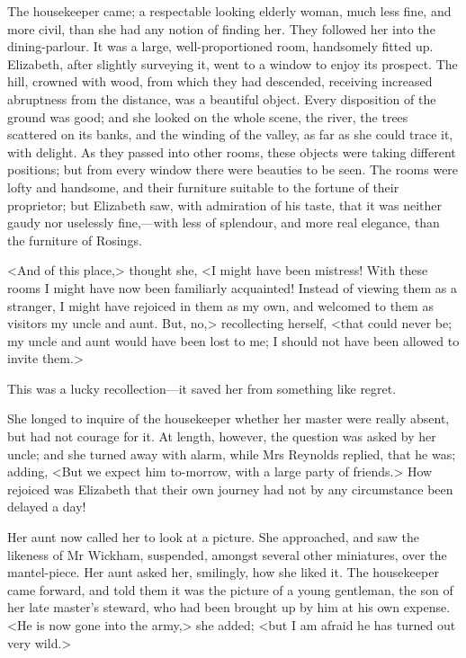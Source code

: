 The housekeeper came; a respectable looking elderly woman, much less fine, and more civil, than she had any notion of finding her. They followed her into the dining-parlour. It was a large, well-proportioned room, handsomely fitted up. Elizabeth, after slightly surveying it, went to a window to enjoy its prospect. The hill, crowned with wood, from which they had descended, receiving increased abruptness from the distance, was a beautiful object. Every disposition of the ground was good; and she looked on the whole scene, the river, the trees scattered on its banks, and the winding of the valley, as far as she could trace it, with delight. As they passed into other rooms, these objects were taking different positions; but from every window there were beauties to be seen. The rooms were lofty and handsome, and their furniture suitable to the fortune of their proprietor; but Elizabeth saw, with admiration of his taste, that it was neither gaudy nor uselessly fine,—with less of splendour, and more real elegance, than the furniture of Rosings.

<And of this place,> thought she, <I might have been mistress! With these rooms I might have now been familiarly acquainted! Instead of viewing them as a stranger, I might have rejoiced in them as my own, and welcomed to them as visitors my uncle and aunt. But, no,> recollecting herself, <that could never be; my uncle and aunt would have been lost to me; I should not have been allowed to invite them.>

This was a lucky recollection—it saved her from something like regret.

She longed to inquire of the housekeeper whether her master were really absent, but had not courage for it. At length, however, the question was asked by her uncle; and she turned away with alarm, while Mrs Reynolds replied, that he was; adding, <But we expect him to-morrow, with a large party of friends.> How rejoiced was Elizabeth that their own journey had not by any circumstance been delayed a day!

Her aunt now called her to look at a picture. She approached, and saw the likeness of Mr Wickham, suspended, amongst several other miniatures, over the mantel-piece. Her aunt asked her, smilingly, how she liked it. The housekeeper came forward, and told them it was the picture of a young gentleman, the son of her late master's steward, who had been brought up by him at his own expense. <He is now gone into the army,> she added; <but I am afraid he has turned out very wild.>


